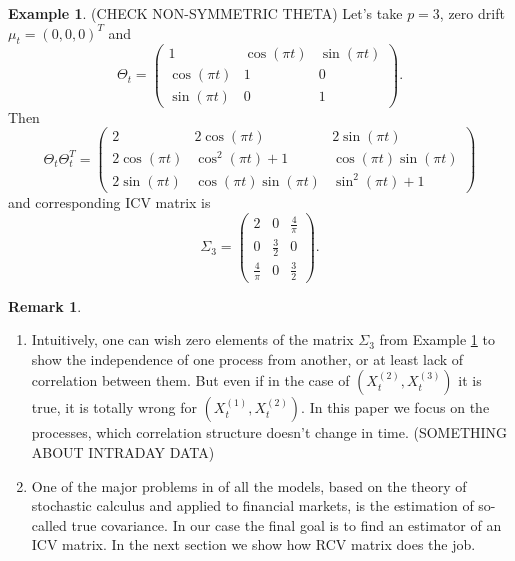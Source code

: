 \documentclass[a4paper,11pt]{article}
\theoremstyle{plain}
\theoremstyle{definition}
\newtheorem{exmp}[thm]{Example}
\newtheorem{rmrk}[thm]{Remark}
\begin{document}
	\begin{exmp} \label{exmp X3}
		(CHECK NON-SYMMETRIC THETA) Let's take $p = 3$, zero drift $\mu_t = (0, 0, 0)^T$ and 
		\[ \Theta_t = \begin{pmatrix}
		1 & \cos(\pi t) & \sin (\pi t) \\
		\cos(\pi t) & 1 & 0 \\
		\sin (\pi t) & 0 & 1
		\end{pmatrix}. \]
		Then 
		\[ \Theta_t\Theta_t^T = \begin{pmatrix}
		2 & 2\cos(\pi t) & 2\sin (\pi t) \\
		2\cos(\pi t) & \cos^2(\pi t) + 1 & \cos(\pi t)\sin(\pi t) \\
		2\sin (\pi t) & \cos(\pi t)\sin(\pi t) & \sin^2(\pi t)+1
		\end{pmatrix} \]
		and corresponding ICV matrix is
		\[ \Sigma_3 = \begin{pmatrix}
		2 & 0 & \frac{4}{\pi} \\
		0 & \frac{3}{2} & 0 \\
		\frac{4}{\pi} & 0 & \frac{3}{2}
		\end{pmatrix}. \]
	\end{exmp}
	
	\begin{rmrk} \
		\begin{enumerate}
			\item 
			Intuitively, one can wish zero elements of the matrix $\Sigma_3$ from Example \ref{exmp X3} to show the independence of one process from another, or at least lack of correlation between them. But even if in the case of $(X_t^{(2)}, X_t^{(3)})$ it is true, it is totally wrong for $(X_t^{(1)}, X_t^{(2)})$. In this paper we focus on the processes, which correlation structure doesn't change in time. (SOMETHING ABOUT INTRADAY DATA)
			\item One of the major problems in of all the models, based on the theory of stochastic calculus and applied to financial markets, is the estimation of so-called true covariance. In our case the final goal is to find an estimator of an ICV matrix. In the next section we show how RCV matrix does the job.
		\end{enumerate}
	\end{rmrk}
	
\end{document}
